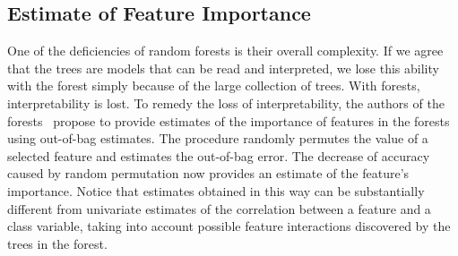 \begin{refsection}
\subsection*{Estimate of Feature Importance}

One of the deficiencies of random forests is their overall complexity. If we agree that the trees are models that can be read and interpreted, we lose this ability with the forest simply because of the large collection of trees. With forests, interpretability is lost. To remedy the loss of interpretability, the authors of the forests~\cite{Brieman2001} propose to provide estimates of the importance of features in the forests using out-of-bag estimates. The procedure randomly permutes the value of a selected feature and estimates the out-of-bag error. The decrease of accuracy caused by random permutation now provides an estimate of the feature's importance. Notice that estimates obtained in this way can be substantially different from univariate estimates of the correlation between a feature and a class variable, taking into account possible feature interactions discovered by the trees in the forest.


\printbibliography[heading=subbibliography]
\end{refsection}
